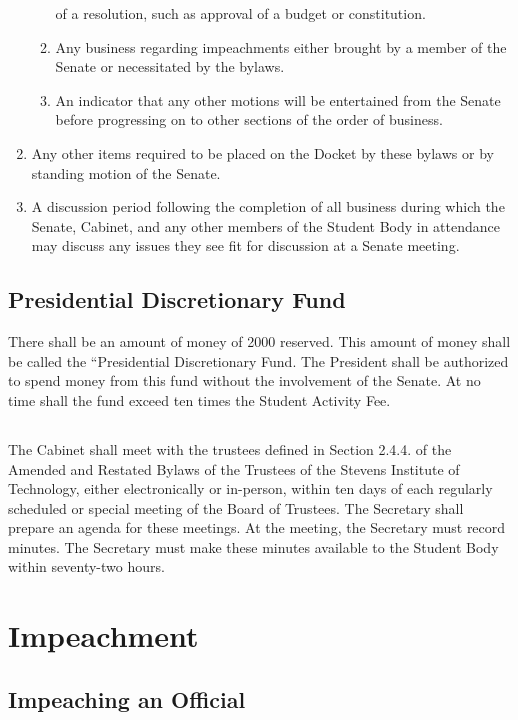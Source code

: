 \documentclass[12pt]{scrreprt}
\begin{document}
\begin{enumerate}
\begin{enumerate}
                  of a resolution, such as approval of a budget or 
                  constitution. 
            \item Any business regarding impeachments either brought by a 
                  member of the Senate or necessitated by the bylaws. 
            \item An indicator that any other motions will be entertained from 
                  the Senate before progressing on to other sections of the 
                  order of business. 
        \end{enumerate}
    \item Any other items required to be placed on the Docket by these bylaws 
          or by standing motion of the Senate.
    \item A discussion period following the completion of all business during which the Senate, Cabinet, and any other members of the Student Body in attendance may discuss any issues they see fit for discussion at a Senate meeting.
\end{enumerate}

\section{Presidential Discretionary Fund}
There shall be an amount of money of 2000 reserved. This amount of money shall be called the “Presidential Discretionary Fund. The President shall be authorized to spend money from this fund without the involvement of the Senate. At no time shall the fund exceed ten times the Student Activity Fee. 

\section{}
The Cabinet shall meet with the trustees defined in Section 2.4.4. of the Amended and Restated Bylaws of the Trustees of the Stevens Institute of Technology, either electronically or in-person, within ten days of each regularly scheduled or special meeting of the Board of Trustees. The Secretary shall prepare an agenda for these meetings. At the meeting, the Secretary must record minutes. The Secretary must make these minutes available to the Student Body within seventy-two hours.

\chapter{Impeachment}

\section{Impeaching an Official}
\end{document}
